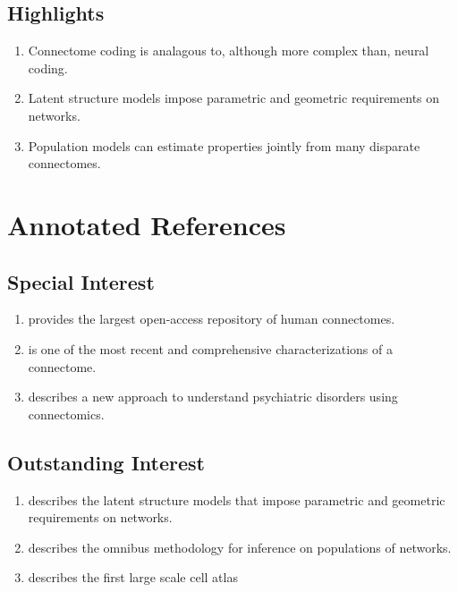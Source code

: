 \documentclass[11pt]{article}
\begin{document}
\vspace{-10pt}



\begin{spacing}{0.3}
{\footnotesize  }
\end{spacing}

\clearpage
\subsection*{Highlights} 

\begin{enumerate} 
\item Connectome coding is analagous to, although more complex than, neural coding. 
\item Latent structure models impose parametric and geometric requirements on networks. 
\item Population models can estimate properties jointly from many disparate connectomes.
\end{enumerate}


\section*{Annotated References}

\subsection*{Special Interest}

\begin{enumerate}
    \item \cite{Kiar2018-bo} provides the largest open-access repository of human connectomes.
    \item \cite{Eichler2017-yi} is one of the  most recent and comprehensive characterizations of a connectome.
    \item \cite{Van_Dam2017-cv} describes a new approach to understand psychiatric disorders using connectomics.
\end{enumerate}

\subsection*{Outstanding Interest}

\begin{enumerate}
    \item \cite{Athreya2018-ks} describes the  latent structure models that impose parametric and geometric requirements on networks.
    \item \cite{Levin2017-ec} describes the omnibus methodology for inference on populations of networks.
    \item \cite{Hodge2018-dr} describes the first large scale cell atlas
\end{enumerate}

\clearpage
\appendix

\renewcommand\thesection{Appendix~\Alph{section}}
\renewcommand{\thefigure}{S\arabic{figure}}
\setcounter{figure}{0}



\end{document}
